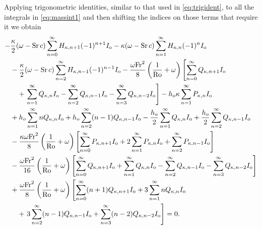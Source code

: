 Applying trigonometric identities, similar to that used in \eqref{eq:trigident}, to all the integrals in \eqref{eq:massint1} and then shifting the indices on those terms that require it we obtain
\begin{align}
-&\frac{\kappa}{2}(\omega-\mathrm{Sr}\,c)\sum_{n=0}^\infty H_{\kappa,n+1} (-1)^{n+1} I_{\text{o}} 
-\kappa(\omega-\mathrm{Sr}\,c)\sum_{n=1}^\infty H_{\kappa,n} (-1)^n I_{\text{o}} \notag \\
&-\frac{\kappa}{2}(\omega-\mathrm{Sr}\,c)\sum_{n=2}^\infty H_{\kappa,n-1} (-1)^{n-1} I_{\text{o}} -\frac{\omega \mathrm{Fr}^2}{8}\left( \frac{1}{\mathrm{Ro}}+\omega \right) \left[\sum_{n=0}^\infty Q_{\kappa,n+1}I_{\text{o}}\right. \notag \\
&\quad+\left.\sum_{n=1}^\infty Q_{\kappa,n}I_{\text{o}}-\sum_{n=2}^\infty Q_{\kappa,n-1}I_{\text{o}}-\sum_{n=3}^\infty Q_{\kappa,n-2}I_{\text{o}}\right]-h_o\kappa\sum_{n=1}^\infty P_{\kappa,n}I_{\text{o}} \notag \\
&+h_o\sum_{n=1}^\infty n Q_{\kappa,n}I_{\text{o}}+h_o\sum_{n=2}^\infty (n-1)Q_{\kappa,n-1}I_{\text{o}}-\frac{h_o}{2}\sum_{n=1}^\infty Q_{\kappa,n}I_{\text{o}}+\frac{h_o}{2}\sum_{n=2}^\infty Q_{\kappa,n-1}I_{\text{o}} \notag \\
&-\frac{\kappa \omega \mathrm{Fr}^2}{8}\left( \frac{1}{\mathrm{Ro}}+\omega \right)\left[ \sum_{n=0}^\infty P_{\kappa,n+1}I_{\text{o}}+2\sum_{n=1}^\infty P_{\kappa,n}I_{\text{o}}+\sum_{n=2}^\infty P_{\kappa,n-1}I_{\text{o}} \right] \notag \\
&-\frac{\omega \mathrm{Fr}^2}{16}\left( \frac{1}{\mathrm{Ro}}+\omega \right)\left[ \sum_{n=0}^\infty Q_{\kappa,n+1}I_{\text{o}} + \sum_{n=1}^\infty Q_{\kappa,n}I_{\text{o}}-\sum_{n=2}^\infty Q_{\kappa,n-1}I_{\text{o}}-\sum_{n=3}^\infty Q_{\kappa,n-2}I_{\text{o}}\right] \notag \\
&+\frac{\omega \mathrm{Fr}^2}{8}\left( \frac{1}{\mathrm{Ro}}+\omega \right)\left[\sum_{n=0}^\infty (n+1)Q_{\kappa,n+1}I_{\text{o}} + 3\sum_{n=1}^\infty nQ_{\kappa,n}I_{\text{o}} \right. \notag \\
&\quad+\left.3\sum_{n=2}^\infty (n-1)Q_{\kappa,n-1}I_{\text{o}}+\sum_{n=3}^\infty (n-2)Q_{\kappa,n-2}I_{\text{o}}\right] =0. \label{eq:shifted}
\end{align}

